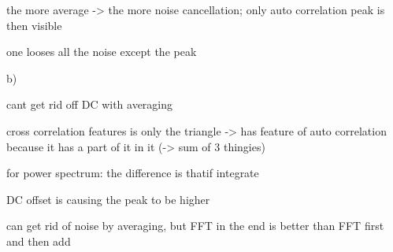 \documentclass[11pt]{report}
\begin{document}
the more average -> the more noise cancellation; only auto correlation peak is then visible

one looses all the noise except the peak

b) 

cant get rid off DC with averaging

cross correlation features is only the triangle
-> has feature of auto correlation because it has a part of it in it (-> sum of 3 thingies)

for power spectrum:
the difference is thatif integrate

DC offset is causing the peak to be higher

can get rid of noise by averaging, but FFT in the end is better than FFT first and then add
\end{document}

